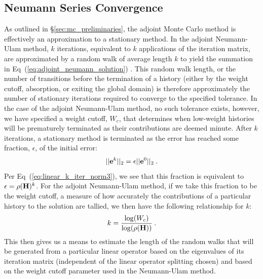 \subsection{Neumann Series Convergence }
\label{subsec:neumann_convergence}
As outlined in \S\ref{sec:mc_preliminaries}, the adjoint Monte Carlo
method is effectively an approximation to a stationary method. In the
adjoint Neumann-Ulam method, $k$ iterations, equivalent to $k$
applications of the iteration matrix, are approximated by a random
walk of average length $k$ to yield the summation in
Eq~(\ref{eq:adjoint_neumann_solution})
\citep{dimov_new_1998,danilov_asymptotic_2000}. This random walk
length, or the number of transitions before the termination of a
history (either by the weight cutoff, absorption, or exiting the
global domain) is therefore approximately the number of stationary
iterations required to converge to the specified tolerance. In the
case of the adjoint Neumann-Ulam method, no such tolerance exists,
however, we have specified a weight cutoff, $W_c$, that determines
when low-weight histories will be prematurely terminated as their
contributions are deemed minute. After $k$ iterations, a stationary
method is terminated as the error has reached some fraction,
$\epsilon$, of the initial error:
\begin{equation}
  ||\mathbf{e}^{k}||_2 = \epsilon ||\mathbf{e}^0||_2\:.
  \label{eq:linear_k_iter_norm4}
\end{equation}
Per Eq~(\ref{eq:linear_k_iter_norm3}), we see that this fraction is
equivalent to $\epsilon = \rho(\mathbf{H})^k$. For the adjoint
Neumann-Ulam method, if we take this fraction to be the weight cutoff,
a measure of how accurately the contributions of a particular history
to the solution are tallied, we then have the following relationship
for $k$:
\begin{equation}
  k = \frac{ \log(W_c) }{ \log( \rho(\mathbf{H}) ) }\:.
  \label{eq:analytic_k}
\end{equation}
This then gives us a means to estimate the length of the random walks
that will be generated from a particular linear operator based on the
eigenvalues of its iteration matrix (independent of the linear
operator splitting chosen) and based on the weight cutoff parameter
used in the Neumann-Ulam method.


